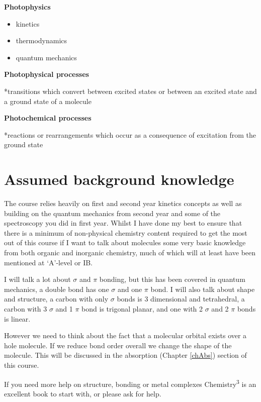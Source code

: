 \documentclass[
]{book}
\providecommand{\tightlist}{%
  \setlength{\itemsep}{0pt}\setlength{\parskip}{0pt}}
\begin{document}
\textbf{Photophysics}

\begin{itemize}
\tightlist
\item
  kinetics
\item
  thermodynamics
\item
  quantum mechanics
\end{itemize}

\textbf{Photophysical processes}

*transitions which convert between excited states or between an excited state and a ground state of a molecule

\textbf{Photochemical processes}

*reactions or rearrangements which occur as a consequence of excitation from the ground state

\hypertarget{assumed-background-knowledge}{%
\section{Assumed background knowledge}\label{assumed-background-knowledge}}

The course relies heavily on first and second year kinetics concepts as well as building on the quantum mechanics from second year and some of the spectroscopy you did in first year. Whilst I have done my best to ensure that there is a minimum of non-physical chemistry content required to get the most out of this course if I want to talk about molecules some very basic knowledge from both organic and inorganic chemistry, much of which will at least have been mentioned at `A'-level or IB.

I will talk a lot about \(\sigma\) and \(\pi\) bonding, but this has been covered in quantum mechanics, a double bond has one \(\sigma\) and one \(\pi\) bond. I will also talk about shape and structure, a carbon with only \(\sigma\) bonds is 3 dimensional and tetrahedral, a carbon with 3 \(\sigma\) and 1 \(\pi\) bond is trigonal planar, and one with 2 \(\sigma\) and 2 \(\pi\) bonds is linear.

However we need to think about the fact that a molecular orbital exists over a hole molecule. If we reduce bond order overall we change the shape of the molecule. This will be discussed in the absorption (Chapter \ref{chAbs}) section of this course.

If you need more help on structure, bonding or metal complexes Chemistry\textsuperscript{3} is an excellent book to start with, or please ask for help.
\end{document}
